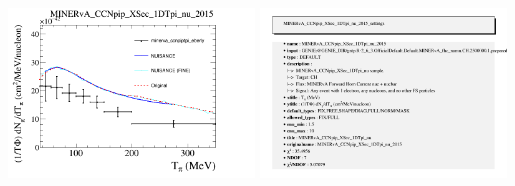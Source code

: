\documentclass{article}
\begin{document}
\centering
\includegraphics[width=0.49\textwidth]{figures/minerva_ccnpiptpi_eberly_comp.png}
\includegraphics[width=0.49\textwidth]{figures/minerva_ccnpiptpi_eberly_info.png}
\end{document}

